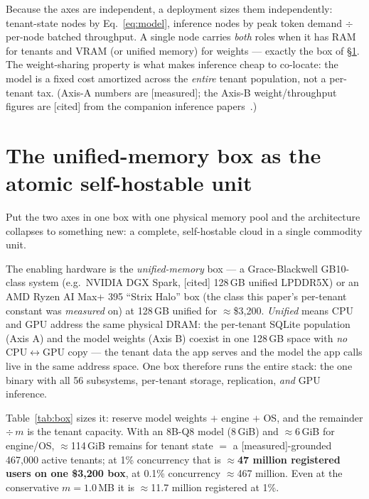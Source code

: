 \documentclass[11pt]{article}
\newcommand{\meas}{\textcolor{blue!60!black}{\small[measured]}}
\newcommand{\cited}{\textcolor{purple!70!black}{\small[cited]}}
\begin{document}
Because the axes are independent, a deployment sizes them independently: tenant-state nodes by
Eq.~\ref{eq:model}, inference nodes by peak token demand $\div$ per-node batched throughput. A
single node carries \emph{both} roles when it has RAM for tenants and VRAM (or unified memory)
for weights --- exactly the box of \S\ref{sec:box}. The weight-sharing property is what makes
inference cheap to co-locate: the model is a fixed cost amortized across the \emph{entire} tenant
population, not a per-tenant tax. (Axis-A numbers are \meas{}; the Axis-B weight/throughput
figures are \cited{} from the companion inference papers~\cite{xbench,edgepaper}.)

\section{The unified-memory box as the atomic self-hostable unit}
\label{sec:box}
Put the two axes in one box with one physical memory pool and the architecture collapses to
something new: a complete, self-hostable cloud in a single commodity unit.

The enabling hardware is the \emph{unified-memory} box --- a Grace-Blackwell GB10-class system
(e.g.\ NVIDIA DGX Spark, \cited{} 128\,GB unified LPDDR5X) or an AMD Ryzen AI Max+ 395 ``Strix
Halo'' box (the class this paper's per-tenant constant was \emph{measured} on) at 128\,GB unified
for $\approx$\$3{,}200. \emph{Unified} means CPU and GPU address the same physical DRAM: the
per-tenant SQLite population (Axis A) and the model weights (Axis B) coexist in one 128\,GB space
with \emph{no} CPU$\leftrightarrow$GPU copy --- the tenant data the app serves and the model the
app calls live in the same address space. One box therefore runs the entire stack: the one
binary with all 56 subsystems, per-tenant storage, replication, \emph{and} GPU inference.

Table~\ref{tab:box} sizes it: reserve model weights $+$ engine $+$ OS, and the remainder $\div\,m$
is the tenant capacity. With an 8B-Q8 model (8\,GiB) and $\approx$6\,GiB for engine/OS,
$\approx$114\,GiB remains for tenant state $=$ a \meas{}-grounded 467{,}000 active tenants; at 1\%
concurrency that is \textbf{$\approx$47 million registered users on one \$3{,}200 box}, at 0.1\%
concurrency $\approx$467 million. Even at the conservative $m=1.0$\,MB it is $\approx$11.7 million
registered at 1\%.
\end{document}
